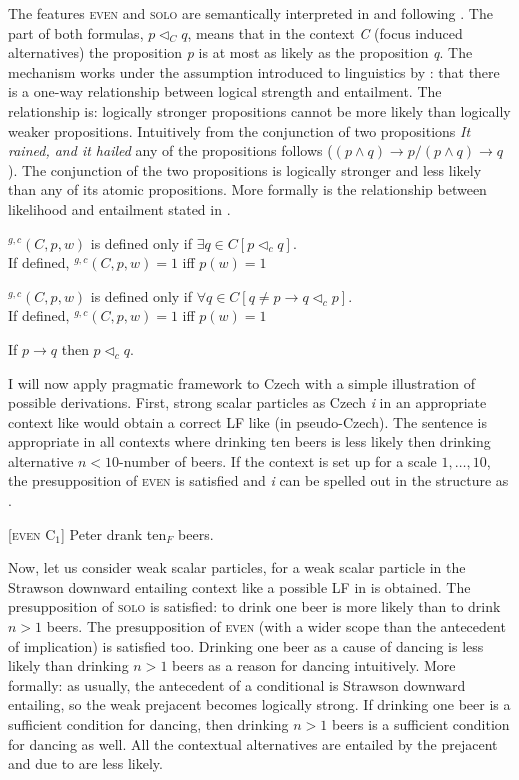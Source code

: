 \documentclass[output=paper,colorlinks,citecolor=brown]{langscibook}
\begin{document}
\noindent The features \textsc{even} and \textsc{solo} are semantically interpreted in  and  following \citet[134]{Crnic2011}. The part of both formulas, \(p \triangleleft_C q\), means that in the context \emph{C} (focus induced alternatives) the proposition \emph{p} is at most as likely as the proposition \emph{q}. The mechanism works under the assumption introduced to linguistics by \citet{lahiri1998focus}: that there is a one-way relationship between logical strength and entailment. The relationship is: logically stronger propositions cannot be more likely than logically weaker propositions. Intuitively from the conjunction of two propositions \emph{It rained, and it hailed} any of the propositions follows (\((p \wedge q) \rightarrow p/(p \wedge q) \rightarrow q\)). The conjunction of the two propositions is logically stronger and less likely than any of its atomic propositions. More formally is the relationship between likelihood and entailment stated in .

\ea\label{ex:42}$^{g,c}(C, p, w)$ is defined only if $\exists q \in C[p \triangleleft_c q]$.\\
If defined, $^{g,c}(C,p,w)=1$ iff $p(w)=1$
\z

\ea\label{ex:43}$^{g,c}(C,p,w)$ is defined only if $\forall q \in C[q \neq p \rightarrow q \triangleleft_c p]$.\\
If defined, $^{g,c}(C,p,w)=1$ iff $p(w)=1$
\z

\ea\label{ex:44}If $p \rightarrow q$ then $p \triangleleft_c q$.
\z


\noindent I will now apply  pragmatic framework to Czech with a simple illustration of possible derivations. First, strong scalar particles as Czech \emph{i} in an appropriate context like  would obtain a correct LF like  (in pseudo-Czech). The sentence is appropriate in all contexts where drinking ten beers is less likely then drinking alternative \(n<10\)-number of beers. If the context is set up for a scale $1,\dots,10$, the presupposition of \textsc{even} is satisfied and \emph{i} can be spelled out in the structure as .

\ea\label{ex:45} [\textsc{even} C$_1$] Peter drank ten$_F$ beers.
\z

\noindent Now, let us consider weak scalar particles, for a weak scalar particle in the Strawson downward entailing context like  a possible LF in  is obtained. The presupposition of \textsc{solo} is satisfied: to drink one beer is more likely than to drink \(n>1\) beers. The presupposition of \textsc{even} (with a wider scope than the antecedent of implication) is satisfied too. Drinking one beer as a cause of dancing is less likely than drinking \(n>1\) beers as a reason for dancing intuitively. More formally: as usually, the antecedent of a conditional is Strawson downward entailing, so the weak prejacent becomes logically strong. If drinking one beer is a sufficient condition for dancing, then drinking \(n>1\) beers is a sufficient condition for dancing as well. All the contextual alternatives are entailed by the prejacent and due to  are less likely.
\end{document}
